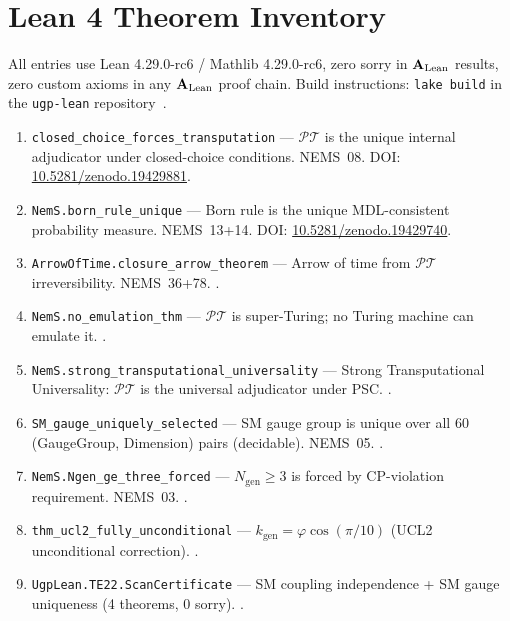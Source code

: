 \documentclass[11pt]{article}
\newcommand{\PT}{\mathcal{P}\mathcal{T}}
\newcommand{\CatAL}{\ensuremath{\textbf{A}_{\rm Lean}}}
\theoremstyle{plain}
\theoremstyle{definition}
\theoremstyle{remark}
\begin{document}
\section{Lean 4 Theorem Inventory}
\label{app:lean}

All entries use Lean 4.29.0-rc6 / Mathlib 4.29.0-rc6, zero sorry in \CatAL{} results, zero custom axioms in any \CatAL{} proof chain.
Build instructions: \texttt{lake build} in the \texttt{ugp-lean} repository~\cite{ugp-lean}.

\begin{enumerate}[leftmargin=0pt,itemindent=0pt,label=\arabic*.,itemsep=3pt]
\small
\item \texttt{closed\_choice\_forces\_transputation} ---
  $\PT$ is the unique internal adjudicator under closed-choice conditions.
  NEMS~08. DOI: \href{https://doi.org/10.5281/zenodo.19429881}{10.5281/zenodo.19429881}.

\item \texttt{NemS.born\_rule\_unique} ---
  Born rule is the unique MDL-consistent probability measure.
  NEMS~13+14. DOI: \href{https://doi.org/10.5281/zenodo.19429740}{10.5281/zenodo.19429740}.

\item \texttt{ArrowOfTime.closure\_arrow\_theorem} ---
  Arrow of time from $\PT$ irreversibility.
  NEMS~36+78. \cite{SpivackNEMSLean}.

\item \texttt{NemS.no\_emulation\_thm} ---
  $\PT$ is super-Turing; no Turing machine can emulate it. \cite{SpivackNEMSLean}.

\item \texttt{NemS.strong\_transputational\_universality} ---
  Strong Transputational Universality: $\PT$ is the universal adjudicator under PSC. \cite{SpivackNEMSLean}.

\item \texttt{SM\_gauge\_uniquely\_selected} ---
  SM gauge group is unique over all 60 (GaugeGroup, Dimension) pairs (decidable). NEMS~05. \cite{SpivackNEMSLean}.

\item \texttt{NemS.Ngen\_ge\_three\_forced} ---
  $N_\mathrm{gen} \ge 3$ is forced by CP-violation requirement. NEMS~03. \cite{SpivackNEMSLean}.

\item \texttt{thm\_ucl2\_fully\_unconditional} ---
  $k_\mathrm{gen} = \varphi\cos(\pi/10)$ (UCL2 unconditional correction). \cite{ugp-lean}.

\item \texttt{UgpLean.TE22.ScanCertificate} ---
  SM coupling independence + SM gauge uniqueness (4 theorems, 0 sorry). \cite{ugp-lean}.


\end{enumerate}
\end{document}
